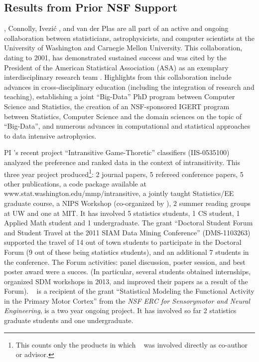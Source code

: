 \subsection{             Results from Prior NSF Support             }
\label{sec:priorNSF}

\meila, Connolly, Ivezi\'{c} , and van der Plas are all part of an active
and ongoing collaboration between statisticians, astrophysicists, and
computer scientists at the University of Washington and Carnegie
Mellon University.  This collaboration, dating to 2001, has
demonstrated sustained success and was cited by the President of the
American Statistical Association (ASA) as an exemplary
interdisciplinary research team \cite{straf03}. Highlights from this
collaboration include advances in cross-disciplinary education
(including the integration of research and teaching), establishing a
joint ``Big-Data'' PhD program between Computer Science and
Statistics, the creation of an NSF-sponsored IGERT program between
Statistics, Computer Science and the domain sciences on the topic of
``Big-Data'', and numerous advances in computational and statistical
approaches to data intensive astrophysics.

PI \meila's recent project ``Intransitive Game-Thoretic'' classifiers
(IIS-0535100) analyzed the preference and ranked data in the context
of intransitivity. This three year project produced\footnote{This
  counts only the products in which \meila~ was involved directly as
  co-author or advisor.}: 2 journal papers, 5 refereed conference
papers, 5 other publications, a code package available at
{www.stat.washington.edu/mmp/intransitive}, a jointly taught
Statistics/EE graduate course, a NIPS Workshop (co-organized by
\meila), 2 summer reading groups at UW and one at MIT. It has involved
5 statistics students, 1 CS student, 1 Applied Math student and 1
undergraduate. The grant ``Doctoral Student Forum and Student Travel
at the 2011 SIAM Data Mining Conference'' (DMS-1103263) supported the
travel of 14 out of town students to participate in the Doctoral Forum
(9 out of these being statistics students), and an additional 7
students in the conference. The Forum activities: panel discussion,
poster session, and best poster award were a succes. (In particular,
several students obtained internships, organized SDM workshops in
2013, and improved their papers as a result of the Forum). \meila~ is
a recipient of the grant ``Statistical Modeling the Functional
Activity in the Primary Motor Cortex'' from the {\em NSF ERC for
  Sensorymotor and Neural Engineering}, is a two year ongoing
project. It has involved so far 2 statistics graduate students and one
undergraduate.

